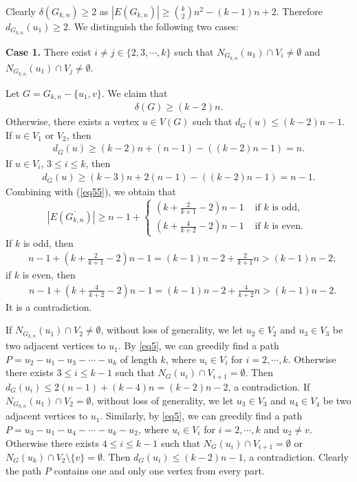 \documentclass[reqno]{amsart}
\begin{document}
Clearly $\delta(G_{k,n}) \geq 2$ as $|E(G_{k,n}) | \geq \binom{k}{2}n^{2}-(k-1) n+2 $. Therefore $d_{G_{k,n}}(u_1) \geq2$.  We distinguish the following two cases:

{\noindent \bf Case 1.} There exist $i \neq j \in \{2,3,\cdots,k\}$ such that $N_{G_{k,n}}(u_1) \cap V_{i} \neq \emptyset$ and $N_{G_{k,n}}(u_1) \cap V_{j} \neq \emptyset$.

Let $G=G_{k,n}-\{u_1,v\}$. We claim that
\begin{align}  \label{eq5}
\delta(G) \geq (k-2)n.
\end{align}
Otherwise, there exists a vertex $u \in V(G)$ such that $d_G(u) \leq (k-2)n-1$. If $u\in V_1$ or $V_2$, then
\begin{align*}
d_{\overline{G}}(u)  \geq  (k-2)n+(n-1)-((k-2)n-1)=n.
\end{align*}
If $u\in V_i$, $3 \leq i \leq k$, then
\begin{align*}
d_{\overline{G}}(u)  \geq  (k-3)n+2(n-1)-((k-2)n-1)=n-1.
\end{align*}
Combining with (\ref{eq55}), we obtain that
 \begin{equation*}
 |E(\overline{G_{k,n}})|\geq n-1+ \left\{\begin{array}{ll}
 \left(k+\frac{2}{k+1}-2\right) n-1 & \text { if } k \text { is odd, }  \\
  \left(k+\frac{4}{k+2}-2\right) n-1 & \text { if } k \text { is even. }
 \end{array}\right.
\end{equation*}
If $k$ is odd, then
 \begin{align*}
 &n-1+\left(k+\frac{2}{k+1}-2\right) n-1 = (k-1)n-2+ \frac{2}{k+1}n > (k-1)n-2;
\end{align*}
if $k$ is even, then
\begin{align*}
 &n-1+\left(k+\frac{4}{k+2}-2\right) n-1 = (k-1)n-2+ \frac{4}{k+2}n > (k-1)n-2.
\end{align*}
It is a contradiction.

If $N_{G_{k,n}}(u_1) \cap V_2 \neq \emptyset$, without loss of generality, we let $u_2 \in V_2$ and $u_3\in V_3$ be two adjacent vertices to $u_1$.  By \ref{eq5}, we can greedily find a path $P=u_2-u_1-u_3-\cdots-u_k$ of length $k$, where $u_i\in V_i$ for $i=2,\cdots,k$. Otherwise there exists $3 \leq i \leq k-1$ such that $N_G(u_i) \cap V_{i+1}=\emptyset$. Then  $d_G(u_i) \leq 2(n-1)+(k-4)n=(k-2)n-2$, a contradiction. If $N_{G_{k,n}}(u_1) \cap V_2 = \emptyset$, without loss of generality, we let $u_3 \in V_3$ and $u_4\in V_4$ be two adjacent vertices to $u_1$. Similarly, by \ref{eq5}, we can greedily find a path $P=u_3-u_1-u_4-\cdots-u_k-u_2$, where $u_i\in V_i$ for $i=2,\cdots,k$ and $u_2 \neq v$. Otherwise there exists $4 \leq i \leq k-1$ such that $N_G(u_i) \cap V_{i+1}=\emptyset$ or $N_G(u_k) \cap V_{2}\setminus\{v\}=\emptyset$. Then  $d_G(u_i) \leq  (k-2)n-1$, a contradiction. Clearly the path $P$ contains one and only one vertex from every part.
\end{document}
